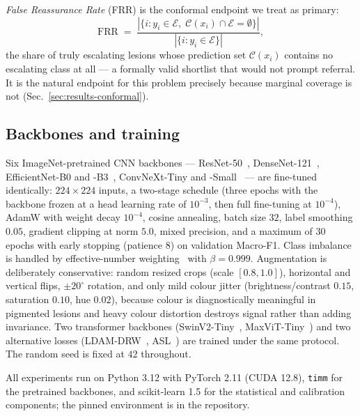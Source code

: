 \documentclass[journal]{IEEEtran}
\begin{document}
\emph{False Reassurance Rate} (FRR) is the conformal endpoint we treat as primary:
\begin{equation}
\mathrm{FRR} \;=\;
\frac{|\{i : y_i \in \mathcal{E},\; \mathcal{C}(x_i) \cap \mathcal{E} = \emptyset\}|}
     {|\{i : y_i \in \mathcal{E}\}|},
\label{eq:frr}
\end{equation}
the share of truly escalating lesions whose prediction set $\mathcal{C}(x_i)$ contains no
escalating class at all --- a formally valid shortlist that would not prompt referral. It is
the natural endpoint for this problem precisely because marginal coverage is not
(Sec.~\ref{sec:results-conformal}).

\subsection{Backbones and training}
Six ImageNet-pretrained CNN backbones --- ResNet-50~\cite{he2016resnet},
DenseNet-121~\cite{huang2017densenet}, EfficientNet-B0 and
-B3~\cite{tan2019efficientnet}, ConvNeXt-Tiny and -Small~\cite{liu2022convnext} --- are
fine-tuned identically: $224\times224$ inputs, a two-stage schedule (three epochs with the
backbone frozen at a head learning rate of $10^{-3}$, then full fine-tuning at $10^{-4}$),
AdamW with weight decay $10^{-4}$, cosine annealing, batch size $32$, label smoothing
$0.05$, gradient clipping at norm $5.0$, mixed precision, and a maximum of $30$ epochs with
early stopping (patience $8$) on validation Macro-F1. Class imbalance is handled by
effective-number weighting~\cite{cui2019classbalanced} with $\beta=0.999$. Augmentation is
deliberately conservative: random resized crops (scale $[0.8,1.0]$), horizontal and vertical
flips, $\pm20^\circ$ rotation, and only mild colour jitter (brightness/contrast $0.15$,
saturation $0.10$, hue $0.02$), because colour is diagnostically meaningful in pigmented
lesions and heavy colour distortion destroys signal rather than adding invariance.
Two transformer backbones (SwinV2-Tiny~\cite{liu2022swinv2}, MaxViT-Tiny~\cite{tu2022maxvit})
and two alternative losses (LDAM-DRW~\cite{cao2019ldam}, ASL~\cite{ridnik2021asl}) are trained
under the same protocol. The random seed is fixed at $42$ throughout.

All experiments run on Python 3.12 with PyTorch 2.11 (CUDA 12.8), \texttt{timm} for the
pretrained backbones, and scikit-learn 1.5 for the statistical and calibration components; the
pinned environment is in the repository.
\end{document}
